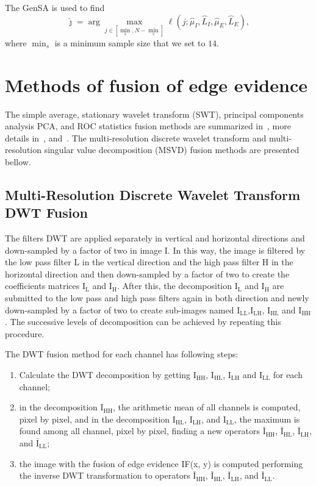 \documentclass[journal]{IEEEtran}
\begin{document}
The GenSA is used to find  
$$
\widehat{\jmath}= \arg\max\limits_{j\in [\min_s,N-\min_s]}\ell(j;\widehat{\mu}_I, \widehat{L}_I,\widehat{\mu}_E, \widehat{L}_E),
$$ 
where $\min_s$ is a minimum sample size that we set to $14$.

\section{Methods of fusion of edge evidence}\label{sec_04}

 The simple average, stationary wavelet transform (SWT), principal components analysis PCA, and ROC statistics fusion methods are summarized in~\cite{bmf_2019}, more details in~\cite{n_r,mit,gs}, and~\cite{fawcett}. The multi-resolution discrete wavelet transform and multi-resolution singular value decomposition (MSVD) fusion methods are presented bellow.

\subsection{Multi-Resolution Discrete Wavelet Transform DWT Fusion~\cite{n_r}}  
The filters DWT are applied separately in vertical and horizontal directions and down-sampled by a factor of two in image I. In this way, the image is filtered by the low pass filter L in the vertical direction and the high pass filter H in the horizontal direction and then down-sampled by a factor of two to create the coefficients matrices $\text{I}_\text{L}$ and $\text{I}_\text{H}$. After this, the decomposition $\text{I}_\text{L}$ and $\text{I}_\text{H}$ are submitted to the low pass and high pass filters again  in both direction and newly down-sampled by a factor of two to create sub-images named $\text{I}_\text{LL}$,$\text{I}_\text{LH}$, $\text{I}_\text{HL}$ and $\text{I}_\text{HH}$. The successive levels of decomposition can be achieved by repeating this procedure.

The DWT fusion method for each channel has following steps:
\begin{enumerate}
\item Calculate the DWT decomposition by getting $\text{I}_\text{HH}$, $\text{I}_\text{HL}$, $\text{I}_\text{LH}$ and $\text{I}_\text{LL}$ for each channel;
\item in the decomposition $\text{I}_\text{HH}$, the arithmetic mean of all channels is computed, pixel by pixel, and in the decomposition $\text{I}_\text{HL}$, $\text{I}_\text{LH}$, and $\text{I}_\text{LL}$, the maximum is found among all channel, pixel by pixel, finding a new operators $\bar{\text{I}}_\text{HH}$, $\bar{\text{I}}_\text{HL}$, $\bar{\text{I}}_\text{LH}$, and $\bar{\text{I}}_\text{LL}$;
\item the image with the fusion of edge evidence IF(x, y) is computed performing the inverse DWT transformation to operators $\bar{\text{I}}_\text{HH}$, $\bar{\text{I}}_\text{HL}$, $\bar{\text{I}}_\text{LH}$, and $\bar{\text{I}}_\text{LL}$.
\end{enumerate}
\end{document}
